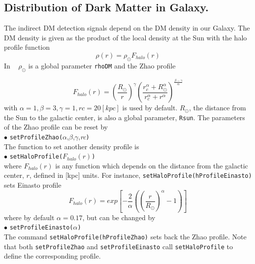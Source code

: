 \documentclass[12pt,a4paper]{article}
\begin{document}
\subsection{Distribution of Dark Matter  in Galaxy.}
The indirect DM detection signals depend on the DM density in our Galaxy.
The DM density is given as the product of the local density at the Sun with the halo profile function 
\begin{equation}
\rho(r)=\rho_\odot F_{halo}(r)
\end{equation}
In \micro~ $\rho_\odot$ is a global parameter {\tt rhoDM} and  the Zhao profile~\cite{Zhao:1995cp}

\begin{equation}
\label{rho}
F_{halo}(r)=\left(\frac{ R_\odot}{r}\right)^{\gamma}
\left(\frac{r_c^{\alpha}+ R_\odot^{\alpha}}
{r_c^{\alpha}+r^{\alpha}}\right)^{\frac{\beta -\gamma}{\alpha}}
\end{equation}
with   $\alpha=1,\beta=3,\gamma=1, rc=20[kpc]$ is used by
default. $R_\odot$, the distance from the Sun to the galactic center,  is also a global parameter, {\tt Rsun}. The parameters of the Zhao profile  can be reset by\\ 
\noindent
$\bullet$ \verb|setProfileZhao(|$\alpha$,$\beta$,$\gamma$,{\it rc}\verb|)|\\
The function to set another  density profile is\\ 
\noindent
$\bullet$ \verb|setHaloProfile(|$F_{halo}(r)$\verb|)|\\
where $F_{halo}(r)$ is any function which depends on the distance from the galactic center,  $r$,
 defined   in [kpc] units.
For instance, \verb|setHaloProfile(hProfileEinasto)|  sets Einasto profile\\
$$
F_{halo}(r)=exp\left[-\frac{2}{\alpha}\left(\left(\frac{r}{R_\odot}\right)^{\alpha}-1\right)\right]
$$
where by default $\alpha=0.17$,   but can be changed by \\ 
\noindent
$\bullet$ \verb|setProfileEinasto(|$\alpha$\verb|)| \\
The command \verb|setHaloProfile(hProfileZhao)| sets back the Zhao profile. Note
that both {\tt setProfileZhao} and {\tt setProfileEinasto} call
{\tt setHaloProfile} to define the corresponding profile. 
\end{document}

